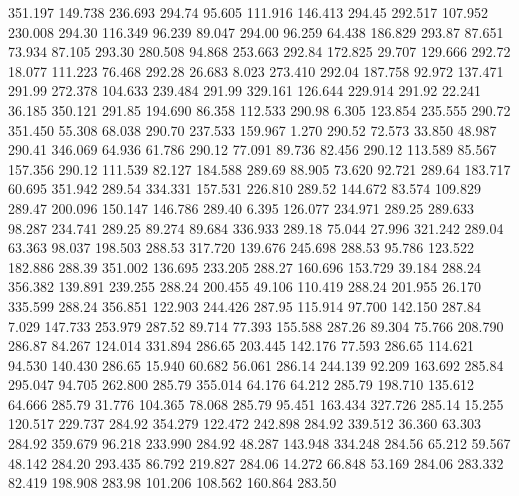  351.197  149.738  236.693       294.74
  95.605  111.916  146.413       294.45
 292.517  107.952  230.008       294.30
 116.349   96.239   89.047       294.00
  96.259   64.438  186.829       293.87
  87.651   73.934   87.105       293.30
 280.508   94.868  253.663       292.84
 172.825   29.707  129.666       292.72
  18.077  111.223   76.468       292.28
  26.683    8.023  273.410       292.04
 187.758   92.972  137.471       291.99
 272.378  104.633  239.484       291.99
 329.161  126.644  229.914       291.92
  22.241   36.185  350.121       291.85
 194.690   86.358  112.533       290.98
   6.305  123.854  235.555       290.72
 351.450   55.308   68.038       290.70
 237.533  159.967    1.270       290.52
  72.573   33.850   48.987       290.41
 346.069   64.936   61.786       290.12
  77.091   89.736   82.456       290.12
 113.589   85.567  157.356       290.12
 111.539   82.127  184.588       289.69
  88.905   73.620   92.721       289.64
 183.717   60.695  351.942       289.54
 334.331  157.531  226.810       289.52
 144.672   83.574  109.829       289.47
 200.096  150.147  146.786       289.40
   6.395  126.077  234.971       289.25
 289.633   98.287  234.741       289.25
  89.274   89.684  336.933       289.18
  75.044   27.996  321.242       289.04
  63.363   98.037  198.503       288.53
 317.720  139.676  245.698       288.53
  95.786  123.522  182.886       288.39
 351.002  136.695  233.205       288.27
 160.696  153.729   39.184       288.24
 356.382  139.891  239.255       288.24
 200.455   49.106  110.419       288.24
 201.955   26.170  335.599       288.24
 356.851  122.903  244.426       287.95
 115.914   97.700  142.150       287.84
   7.029  147.733  253.979       287.52
  89.714   77.393  155.588       287.26
  89.304   75.766  208.790       286.87
  84.267  124.014  331.894       286.65
 203.445  142.176   77.593       286.65
 114.621   94.530  140.430       286.65
  15.940   60.682   56.061       286.14
 244.139   92.209  163.692       285.84
 295.047   94.705  262.800       285.79
 355.014   64.176   64.212       285.79
 198.710  135.612   64.666       285.79
  31.776  104.365   78.068       285.79
  95.451  163.434  327.726       285.14
  15.255  120.517  229.737       284.92
 354.279  122.472  242.898       284.92
 339.512   36.360   63.303       284.92
 359.679   96.218  233.990       284.92
  48.287  143.948  334.248       284.56
  65.212   59.567   48.142       284.20
 293.435   86.792  219.827       284.06
  14.272   66.848   53.169       284.06
 283.332   82.419  198.908       283.98
 101.206  108.562  160.864       283.50
